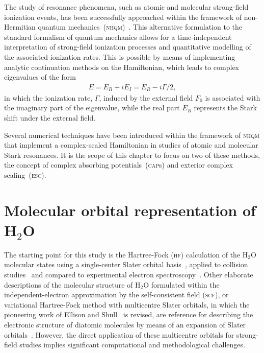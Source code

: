The study of resonance phenomena, such as atomic and molecular
strong-field ionization events, has been successfully approached
within the framework of non-Hermitian quantum
mechanics~(\textsc{nhqm})~\cite{Moiseyev_NHQM}. This alternative
formulation to the standard formalism of quantum mechanics allows for
a time-independent interpretation of strong-field ionization processes
and quantitative modelling of the associated ionization rates. This is
possible by means of implementing analytic continuation methods on the
Hamiltonian, which leads to complex eigenvalues of the form
%
\begin{eqnarray}
  E = E_{R} + i E_{I} = E_{R} - i \Gamma/2,
  \label{eq:complex_eigenE}
\end{eqnarray}
%
in which the ionization rate, $\Gamma$, induced by the external field
$F_{0}$ is associated with the imaginary part of the eigenvalue, while
the real part $E_{R}$ represents the Stark shift under the external
field.

Several numerical techniques have been introduced within the framework
of \textsc{nhqm} that implement a complex-scaled Hamiltonian in
studies of atomic and molecular Stark resonances. It is the scope of
this chapter to focus on two of these methods, the concept of complex
absorbing potentials~(\textsc{cap}s) and exterior complex
scaling~(\textsc{esc}).




\section{Molecular orbital representation of H$_{2}$O}
\label{ch:h2o_structure}

The starting point for this study is the Hartree-Fock (\textsc{hf})
calculation of the H$_{2}$O molecular states using a single-center
Slater orbital
basis~\cite{Moccia_1964,Moccia_JCP_2164,Moccia_JCP_2176}, applied to
collision studies~\cite{Montanari_2013} and compared to experimental
electron spectroscopy~\cite{Hafied_2007}. Other elaborate descriptions
of the molecular structure of H$_{2}$O formulated within the
independent-electron approximation by the self-consistent field
(\textsc{scf}), or variational Hartree-Fock method with multicentre
Slater orbitals, in which the pioneering work of Ellison and
Shull~\cite{EllisonShullh2o_1955} is revised, are reference for
describing the electronic structure of diatomic molecules by means of
an expansion of Slater
orbitals~\cite{Pitzer_1968,Pitzer_1970}. However, the direct
application of these multicentre orbitals for strong-field studies
implies significant computational and methodological challenges.

